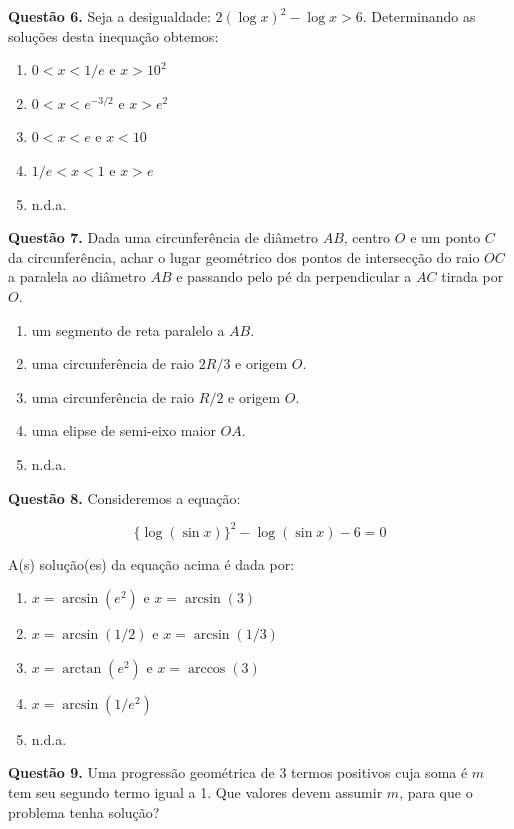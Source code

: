 \documentclass[11pt]{article}
\begin{document}
\textbf{Questão 6.} Seja a desigualdade: $2(\log x)^2 - \log x > 6$. Determinando as soluções desta inequação obtemos:

\begin{enumerate}[\bf A (\quad)]
    \item $0 < x < 1/e$ e $x > 10^2$
    \item $0 < x < e^{-3/2}$ e $x > e^2$
    \item $0 < x < e$ e $x < 10$
    \item $1/e < x < 1$ e $x > e$
    \item n.d.a.
\end{enumerate}

\textbf{Questão 7.} Dada uma circunferência de diâmetro $AB$, centro $O$ e um ponto $C$ da circunferência, achar o lugar geométrico dos pontos de intersecção do raio $OC$ a paralela ao diâmetro $AB$ e passando pelo pé da perpendicular a $AC$ tirada por $O$.

\begin{enumerate}[\bf A (\quad)]
    \item um segmento de reta paralelo a $AB$.
    \item uma circunferência de raio $2R/3$ e origem $O$.
    \item uma circunferência de raio $R/2$ e origem $O$.
    \item uma elipse de semi-eixo maior $OA$.
    \item n.d.a.
\end{enumerate}

\textbf{Questão 8.} Consideremos a equação:

$$
\{ \log(\sin x)\}^2 - \log(\sin x ) - 6 = 0
$$

A(s) solução(es) da equação acima é dada por:

\begin{enumerate}[\bf A (\quad)]
    \item $x = \arcsin (e^2)$ e $x = \arcsin (3)$
    \item $x = \arcsin (1/2)$ e $x = \arcsin (1/3)$
    \item $x = \arctan (e^2)$ e $x = \arccos (3)$
    \item $x = \arcsin (1/e^2)$
    \item n.d.a.
\end{enumerate}

\textbf{Questão 9.} Uma progressão geométrica de 3 termos positivos cuja soma é $m$ tem seu segundo termo igual a 1. Que valores devem assumir $m$, para que o problema tenha solução?
\end{document}

